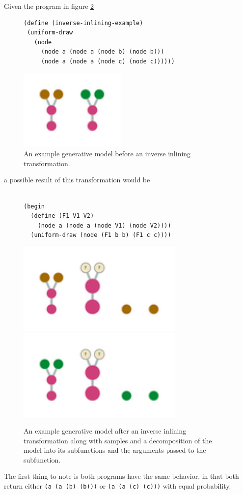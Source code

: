 \documentclass[a4paper,10pt]{article}
\begin{document}
Given the program in figure \ref{prog:csrExample}
\begin{figure}[htbp]
\begin{center}
\begin{verbatim}
(define (inverse-inlining-example)
 (uniform-draw 
   (node
     (node a (node a (node b) (node b)))
     (node a (node a (node c) (node c))))))
\end{verbatim}
\includegraphics[scale=.40]{csrExample.pdf}
\end{center}
\label{prog:csrExample}
\caption{An example generative model before an inverse inlining transformation.}
\end{figure}
a possible result of this transformation would be
\begin{figure}[htbp]
\begin{center}
\begin{verbatim}

(begin
  (define (F1 V1 V2)
    (node a (node a (node V1) (node V2))))
  (uniform-draw (node (F1 b b) (F1 c c))))
\end{verbatim}
\includegraphics[scale=.40]{csrDecompose1.pdf}\\
\includegraphics[scale=.40]{csrDecompose2.pdf}
\end{center}
\label{prog:csrExample}
\caption{An example generative model after an inverse inlining transformation along with samples and a decomposition of the model into its subfunctions and the arguments passed to the subfunction.}
\end{figure}
The first thing to note is both programs have the same behavior, in that both return either \texttt{(a (a (b) (b)))} or \texttt{(a (a (c) (c)))} with equal probability.
\end{document}
